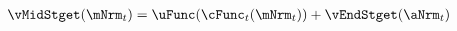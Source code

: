   \begin{equation}\begin{gathered}\begin{aligned}
\vMidStget(\mNrm_{t}) & = \uFunc(\cFunc_{t}(\mNrm_{t})) + \vEndStget(\aNrm_{t}) \label{eq:vMidStget}
      \end{aligned}\end{gathered}\end{equation}
